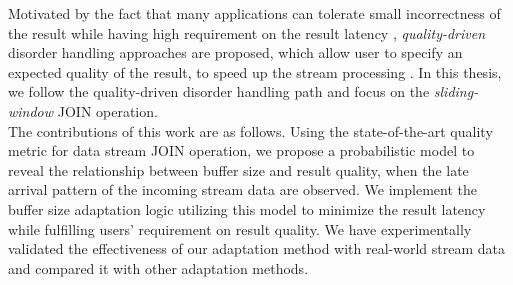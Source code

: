 \documentclass[a4paper, 11pt, twoside]{report}
\begin{document}

Motivated by the fact that many applications can tolerate small incorrectness of the result while having high requirement on the result latency \cite{abadi2003aurora}, \textit{quality-driven} disorder handling approaches are proposed, which allow user to specify an expected quality of the result, to speed up the stream processing \cite{Lisa}. In this thesis, we follow the quality-driven disorder handling path and focus on the \textit{sliding-window} JOIN operation.\\

The contributions of this work are as follows. Using the state-of-the-art quality metric for data stream JOIN operation, we propose a probabilistic model to reveal the relationship between buffer size and result quality, when the late arrival pattern of the incoming stream data are observed. We implement the buffer size adaptation logic utilizing this model to minimize the result latency while fulfilling users' requirement on result quality. We have experimentally validated the effectiveness of our adaptation method with real-world stream data and compared it with other adaptation methods.\\
\end{document}
